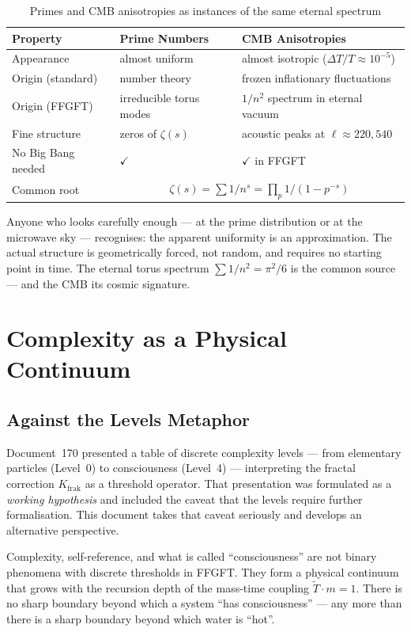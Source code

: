 \begin{table}[ht]
\centering
\begin{tabular}{|p{3.8cm}|p{4.5cm}|p{4.5cm}|}
\hline
\textbf{Property} & \textbf{Prime Numbers} & \textbf{CMB Anisotropies} \\
\hline
Appearance & almost uniform & almost isotropic ($\Delta T/T \approx 10^{-5}$) \\
\hline
Origin (standard) & number theory & frozen inflationary fluctuations \\
\hline
Origin (FFGFT) & irreducible torus modes & $1/n^2$ spectrum in eternal vacuum \\
\hline
Fine structure & zeros of $\zeta(s)$ & acoustic peaks at $\ell \approx 220, 540$ \\
\hline
No Big Bang needed & $\checkmark$ & $\checkmark$ in FFGFT \\
\hline
Common root & \multicolumn{2}{c|}{$\zeta(s) = \sum 1/n^s = \prod_p 1/(1-p^{-s})$} \\
\hline
\end{tabular}
\caption{Primes and CMB anisotropies as instances of the same eternal spectrum}
\end{table}

Anyone who looks carefully enough — at the prime distribution or at the
microwave sky — recognises: the apparent uniformity is an approximation.
The actual structure is geometrically forced, not random, and requires
no starting point in time. The eternal torus spectrum $\sum 1/n^2 = \pi^2/6$
is the common source — and the CMB its cosmic signature.
\section{Complexity as a Physical Continuum}

\subsection{Against the Levels Metaphor}

Document~170 presented a table of discrete complexity levels — from elementary
particles (Level~0) to consciousness (Level~4) — interpreting the fractal correction
$K_\text{frak}$ as a threshold operator. That presentation was formulated as a
\textit{working hypothesis} and included the caveat that the levels require further
formalisation. This document takes that caveat seriously and develops an alternative
perspective.

\begin{important}
Complexity, self-reference, and what is called ``consciousness'' are not binary
phenomena with discrete thresholds in FFGFT.
They form a physical continuum that grows with the recursion depth of the
mass-time coupling $\tilde{T} \cdot m = 1$.
There is no sharp boundary beyond which a system ``has consciousness'' — any more
than there is a sharp boundary beyond which water is ``hot''.
\end{important}

